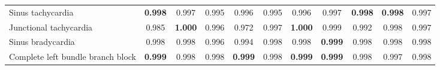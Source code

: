 \documentclass{article}
\begin{document}
\begin{table}[htbp]
\begin{tabular}{lcccccccccc}
                        Sinus tachycardia & \textbf{0.998} & 0.997 & 0.995 & 0.996 & 0.995 & 0.996 & 0.997 & \textbf{0.998} & \textbf{0.998} & 0.997 \\
                        Junctional tachycardia & 0.985 & \textbf{1.000} & 0.996 & 0.972 & 0.997 & \textbf{1.000} & 0.999 & 0.992 & 0.998 & 0.997 \\
                        Sinus bradycardia & 0.998 & 0.998 & 0.996 & 0.994 & 0.998 & 0.998 & \textbf{0.999} & 0.998 & 0.998 & 0.998 \\
                        Complete left bundle branch block &\textbf{0.999} & 0.998 & 0.998 & \textbf{0.999} & 0.998 & \textbf{0.999} & \textbf{0.999} & 0.998 & 0.997 & 0.998 \\
                        \bottomrule
                    \end{tabular}
                    \label{tab:results_overview_ningbo}
                \end{table}
                
\end{document}
